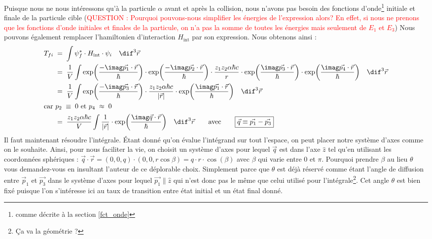 Puisque nous ne nous intéressons qu'à la particule $\alpha$ avant et après la collision, nous n'avons pas besoin des fonctions d'onde\footnote{comme décrite à la section \ref{fct_onde}} initiale et finale de la particule cible (\textcolor{red}{QUESTION : Pourquoi pouvons-nous simplifier les énergies de l'expression alors? En effet, si nous ne prenons que les fonctions d'onde initiales et finales de la particule, on n'a pas la somme de toutes les énergies mais seulement de $E_1$ et $E_3$})
Nous pouvons également remplacer l'hamiltonien d'interaction $H_\text{int}$ par son expression. Nous obtenons ainsi :
\begin{align*}
    T_{fi}
&\eq
    \int \psi_f^* \cdot H_\text{int} \cdot \psi_i \quad \dif^3\vec{r}\\
&\eq
    \dfrac{1}{V} 
    \int 
    \exp(\dfrac{-\imag \vec{p_1}\cdot\vec{r}}{\hbar})     \cdot
    \exp(\dfrac{-\imag \vec{p_2}\cdot\vec{r}}{\hbar})     \cdot
    \dfrac{z_1 z_2\alpha\hbar c}{r}                     \cdot
    \exp(\dfrac{ \imag \vec{p_3}\cdot\vec{r}}{\hbar})     \cdot
    \exp(\dfrac{ \imag \vec{p_4}\cdot\vec{r}}{\hbar})
    \quad \dif^3\vec{r}\\
&\eq
    \dfrac{1}{V} 
    \int 
    \exp(\dfrac{-\imag \vec{p_3}\cdot\vec{r}}{\hbar})     \cdot
    \dfrac{z_1 z_2\alpha\hbar c}{|\vec{r}|}             \cdot
    \exp(\dfrac{ \imag \vec{p_1}\cdot\vec{r}}{\hbar})
    \quad \dif^3\vec{r}\\
\intertext{car $p_2\;\equiv\;0$ et $p_4\;\approx\;0$}
&\eq
    \dfrac{z_1 z_2\alpha\hbar c}{V} 
    \int 
    \dfrac{1}{|\vec{r}|} \cdot \exp(\dfrac{\imag \vec{q}\cdot\vec{r}}{\hbar})
    \quad \dif^3\vec{r} 
    \qquad \text{avec} \qquad \boxed{ \vec{q} \equiv \vec{p_1}-\vec{p_3}}
\end{align*}
Il faut maintenant résoudre l'intégrale. Étant donné qu'on évalue l'intégrand sur tout l'espace, on peut placer notre système d'axes comme on le souhaite. Ainsi, pour nous faciliter la vie, on choisit un système d'axes pour lequel $\vec{q}$ est dans l'axe $\hat{z}$ tel qu'en utilisant les coordonnées sphériques : $\vec{q}\cdot\vec{r} = (0,0,q)\cdot(0,0,r\cos{\beta}) = q\cdot r \cdot \cos(\beta)$ avec $\beta$ qui varie entre 0 et $\pi$. Pourquoi prendre $\beta$ au lieu $\theta$ vous demandez-vous en insultant l'auteur de ce déplorable choix. Simplement parce que $\theta$ est déjà réservé comme étant l'angle de diffusion entre $\vec{p}_1$ et $\vec{p_3}$ dans le système d'axes pour lequel $\vec{p_1} \parallel \hat{z}$ qui n'est donc pas le même que celui utilisé pour l'intégrale\footnote{Ça va la géométrie ?}. Cet angle $\theta$ est bien fixé puisque l'on s'intéresse ici au taux de transition entre état initial et un état final donné.
